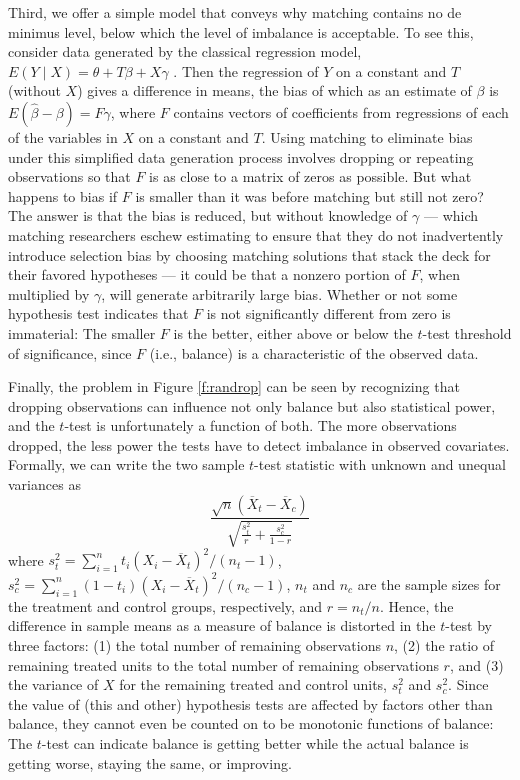 \documentclass[11pt,titlepage]{article}
\begin{document}
Third, we offer a simple model that conveys why matching contains no
de minimus level, below which the level of imbalance is acceptable.
To see this, consider data generated by the classical regression
model, $E(Y\mid X)= \theta + T\beta + X\gamma$ \citep{Goldberger91}.
Then the regression of $Y$ on a constant and $T$ (without $X$) gives a
difference in means, the bias of which as an estimate of $\beta$ is
$E(\hat\beta-\beta) = F\gamma$, where $F$ contains vectors of
coefficients from regressions of each of the variables in $X$ on a
constant and $T$.  Using matching to eliminate bias under this
simplified data generation process involves dropping or repeating
observations so that $F$ is as close to a matrix of zeros as possible.
But what happens to bias if $F$ is smaller than it was before matching
but still not zero?  The answer is that the bias is reduced, but
without knowledge of $\gamma$ --- which matching researchers eschew
estimating to ensure that they do not inadvertently introduce
selection bias by choosing matching solutions that stack the deck for
their favored hypotheses --- it could be that a nonzero portion of
$F$, when multiplied by $\gamma$, will generate arbitrarily large
bias.  Whether or not some hypothesis test indicates that $F$ is not
significantly different from zero is immaterial: The smaller $F$ is
the better, either above or below the $t$-test threshold of
significance, since $F$ (i.e., balance) is a characteristic of the
observed data.

Finally, the problem in Figure \ref{f:randrop} can be seen by
recognizing that dropping observations can influence not only balance
but also statistical power, and the $t$-test is unfortunately a
function of both.  The more observations dropped, the less power the
tests have to detect imbalance in observed covariates.  Formally, we
can write the two sample $t$-test statistic with unknown and
unequal variances as
\begin{equation}
  \label{ttest} \frac{\sqrt{n}(\overline{X}_t-\overline{X}_c)}
               {\sqrt{\frac{s^2_t}{r} + \frac{s^2_c}{1-r}}}
\end{equation}
where $s^2_t=\sum_{i=1}^n t_i(X_i - \overline{X}_t)^2/(n_t-1)$,
$s^2_c=\sum_{i=1}^n (1-t_i)(X_i - \overline{X}_t)^2/(n_c-1)$, $n_t$
and $n_c$ are the sample sizes for the treatment and control groups,
respectively, and $r=n_t/n$.  Hence, the difference in sample means as
a measure of balance is distorted in the $t$-test by three factors:
(1) the total number of remaining observations $n$, (2) the ratio of
remaining treated units to the total number of remaining observations
$r$, and (3) the variance of $X$ for the remaining treated and control
units, $s_t^2$ and $s_c^2$.  Since the value of (this and other)
hypothesis tests are affected by factors other than balance, they
cannot even be counted on to be monotonic functions of balance: The
$t$-test can indicate balance is getting better while the actual
balance is getting worse, staying the same, or improving.
\end{document}
